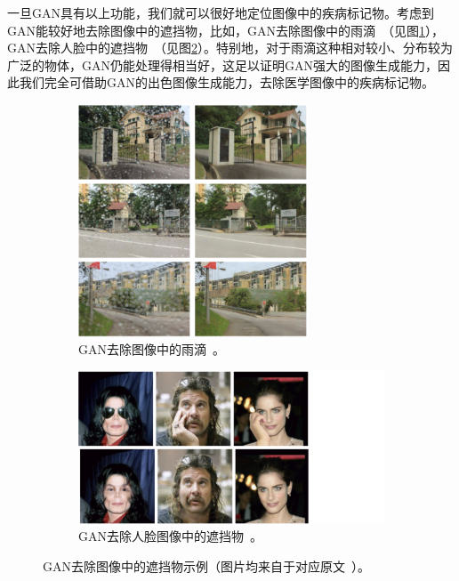 \noindent 一旦GAN具有以上功能，我们就可以很好地定位图像中的疾病标记物。考虑到GAN能较好地去除图像中的遮挡物，比如，GAN去除图像中的雨滴~\cite{qian2018attentive}（见图\ref{subfig:attention_gan}），GAN去除人脸中的遮挡物~\cite{yuan2019face}（见图\ref{subfig:face_de_occulusion}）。特别地，对于雨滴这种相对较小、分布较为广泛的物体，GAN仍能处理得相当好，这足以证明GAN强大的图像生成能力，因此我们完全可借助GAN的出色图像生成能力，去除医学图像中的疾病标记物。
\begin{figure}[h!]
	\begin{subfigure}{0.45\textwidth}
		\centering
		\includegraphics[width=0.75\textwidth]{figure/attention_gan_example.png}
		\caption{GAN去除图像中的雨滴~\cite{qian2018attentive}。}
		\label{subfig:attention_gan}
	\end{subfigure}
	\begin{subfigure}{0.45\textwidth}
		\centering
		\includegraphics[width=1.5\textwidth]{figure/face_de_occulusion.png}
		\caption{GAN去除人脸图像中的遮挡物~\cite{yuan2019face}。}
		\label{subfig:face_de_occulusion}
	\end{subfigure}
	\caption[GAN去除图像中的遮挡物示例]{GAN去除图像中的遮挡物示例（图片均来自于对应原文~\cite{qian2018attentive,yuan2019face}）。}
	\label{mul_fig:gan_auto_encoder_example}
\end{figure}
